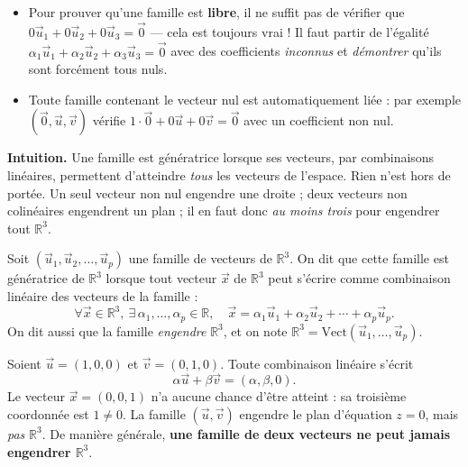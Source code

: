 \documentclass[11pt]{article}
\newcommand{\cle}[1]{{\popxbold\color{popdark}#1}}
\newcounter{popsec}
\newcounter{popsub}
\newcommand{\courssub}[1]{%
  \stepcounter{popsub}%
  \par\vspace{9pt}\noindent{\popxbold\fontsize{11.5}{13}\selectfont\color{popink}{\color{poporange}\thepopsec.\thepopsub}\hspace{6pt}#1}\par\nopagebreak\vspace{4pt}
}
\begin{document}
\begin{attention}
\begin{itemize}
\item Pour prouver qu'une famille est \textbf{libre}, il ne suffit pas de vérifier que $0\vec{u}_1 + 0\vec{u}_2 + 0\vec{u}_3 = \vec{0}$ — cela est toujours vrai ! Il faut partir de l'égalité $\alpha_1\vec{u}_1 + \alpha_2\vec{u}_2 + \alpha_3\vec{u}_3 = \vec{0}$ avec des coefficients \emph{inconnus} et \emph{démontrer} qu'ils sont forcément tous nuls.
\item Toute famille contenant le vecteur nul est automatiquement liée : par exemple $(\vec{0}, \vec{u}, \vec{v})$ vérifie $1\cdot\vec{0} + 0\vec{u} + 0\vec{v} = \vec{0}$ avec un coefficient non nul.
\end{itemize}
\end{attention}

\courssub{Familles génératrices}

\textbf{Intuition.} Une famille est génératrice lorsque ses vecteurs, par combinaisons linéaires, permettent d'atteindre \emph{tous} les vecteurs de l'espace. Rien n'est hors de portée. Un seul vecteur non nul engendre une droite ; deux vecteurs non colinéaires engendrent un plan ; il en faut donc \emph{au moins trois} pour engendrer tout $\mathbb{R}^3$.

\begin{definition}
Soit $(\vec{u}_1, \vec{u}_2, \ldots, \vec{u}_p)$ une famille de vecteurs de $\mathbb{R}^3$. On dit que cette famille est \cle{génératrice} de $\mathbb{R}^3$ lorsque tout vecteur $\vec{x}$ de $\mathbb{R}^3$ peut s'écrire comme combinaison linéaire des vecteurs de la famille :
\[ \forall \vec{x} \in \mathbb{R}^3,\ \exists\, \alpha_1, \ldots, \alpha_p \in \mathbb{R},\quad \vec{x} = \alpha_1 \vec{u}_1 + \alpha_2 \vec{u}_2 + \cdots + \alpha_p \vec{u}_p. \]
On dit aussi que la famille \emph{engendre} $\mathbb{R}^3$, et on note $\mathbb{R}^3 = \mathrm{Vect}(\vec{u}_1, \ldots, \vec{u}_p)$.
\end{definition}

\begin{exemplebox}
Soient $\vec{u} = (1, 0, 0)$ et $\vec{v} = (0, 1, 0)$. Toute combinaison linéaire s'écrit
\[ \alpha \vec{u} + \beta \vec{v} = (\alpha, \beta, 0). \]
Le vecteur $\vec{x} = (0, 0, 1)$ n'a aucune chance d'être atteint : sa troisième coordonnée est $1 \neq 0$. La famille $(\vec{u}, \vec{v})$ engendre le plan d'équation $z = 0$, mais \emph{pas} $\mathbb{R}^3$. De manière générale, \textbf{une famille de deux vecteurs ne peut jamais engendrer $\mathbb{R}^3$}.
\end{exemplebox}
\end{document}
